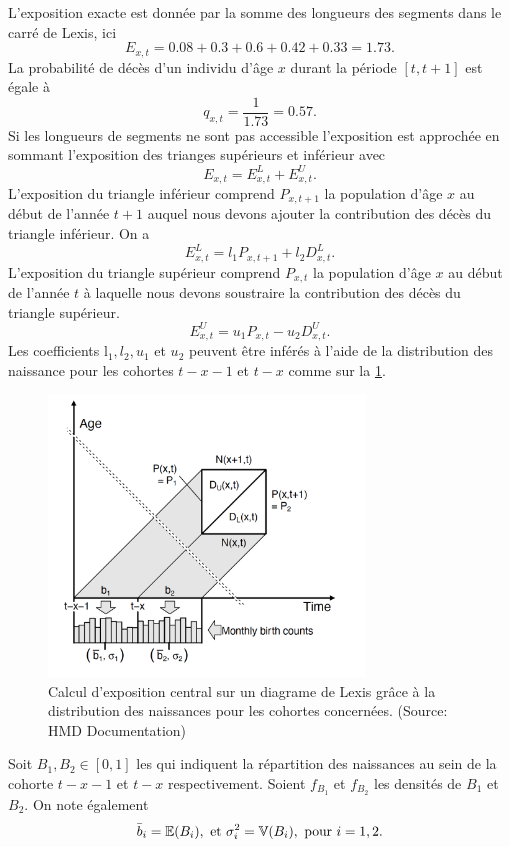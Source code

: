 L'exposition exacte est donnée par la somme des longueurs des segments dans le carré de Lexis, ici 
$$
E_{x,t} =  0.08 + 0.3 + 0.6 + 0.42 + 0.33 = 1.73.
$$
La probabilité de décès d'un individu d'âge $x$ durant la période $[t, t+1]$ est égale à 
$$
q_{x,t} = \frac{1}{1.73} = 0.57.
$$
Si les longueurs de segments ne sont pas accessible l'exposition est approchée en sommant l'exposition des trianges supérieurs et inférieur avec 
$$
E_{x,t} = E_{x,t}^L + E_{x,t}^U.
$$
L'exposition du triangle inférieur comprend $P_{x,t+1}$ la population d'âge $x$ au début de l'année $t+1$ auquel nous devons ajouter la contribution des décès du triangle inférieur. On a 
$$
E_{x,t}^L = l_1P_{x,t+1}+l_2D^{L}_{x,t}.
$$
L'exposition du triangle supérieur comprend $P_{x,t}$ la population d'âge $x$ au début de l'année $t$ à laquelle nous devons soustraire la contribution des décès du triangle supérieur.  
$$
E_{x,t}^U = u_1P_{x,t}-u_2D^{U}_{x,t}.
$$
Les coefficients l$_1, l_2, u_1$ et $u_2$ peuvent être inférés à l'aide de la distribution des naissance pour les cohortes $t-x-1$ et $t-x$ comme sur la \cref{fig:Lexis_expo_computation}. 
\begin{figure}[h!] 
\centering
\includegraphics[width = 0.75\textwidth]{../figures/Lexis_expo_computation.png}
\caption{Calcul d'exposition central sur un diagrame de Lexis grâce à la distribution des naissances pour les cohortes concernées. (Source: HMD Documentation)}
\label{fig:Lexis_expo_computation}
\end{figure}
Soit $B_1,B_2\in[0,1]$ les \va qui indiquent la répartition des naissances au sein de la cohorte $t-x-1$ et $t-x$ respectivement. Soient $f_{B_1}$ et $f_{B_2}$ les densités de $B_1$ et $B_2$. On note également 
$$
\bar{b}_i = \mathbb{E}(B_i),\text{ et }\sigma_i^2 = \mathbb{V}(B_i),\text{ pour }i = 1,2.
$$
